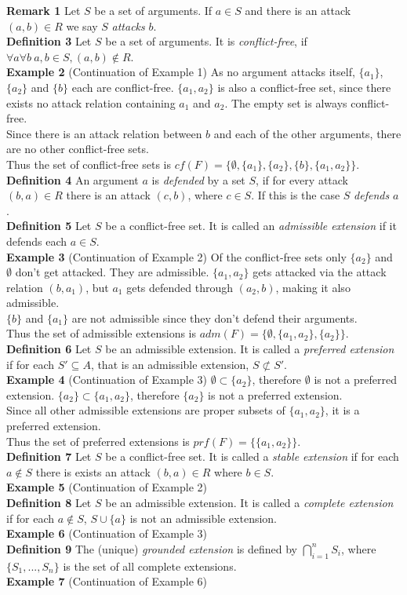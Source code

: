 \documentclass{article}
\newcommand{\nl}{\\[6pt]}
\newcommand{\dl}{\\[12pt]}
\begin{document}
\textbf{Remark 1} Let $S$ be a set of arguments. If $a\in S$ and there is an attack $(a,b)\in R$ we say $S$ \emph{attacks} $b$.\dl
\textbf{Definition 3} Let $S$ be a set of arguments. It is \emph{conflict-free}, if $\forall a \forall b\ a,b\in S, (a,b)\notin R$.\dl
\textbf{Example 2} (Continuation of Example 1) As no argument attacks itself, $\{a_1\}$, $\{a_2\}$ and $\{b\}$ each are conflict-free. $\{a_1,a_2\}$ is also a conflict-free set, since there exists no attack relation containing $a_1$ and $a_2$. The empty set is always conflict-free.\\
Since there is an attack relation between $b$ and each of the other arguments, there are no other conflict-free sets.\nl
Thus the set of conflict-free sets is $cf(F)=\{\emptyset,\{a_1\},\{a_2\},\{b\},\{a_1,a_2\}\}$.\dl
\textbf{Definition 4} An argument $a$ is \emph{defended} by a set $S$, if for every attack $(b,a)\in R$ there is an attack $(c,b)$, where $c\in S$. If this is the case $S$ \emph{defends} $a$.\dl
\textbf{Definition 5} Let $S$ be a conflict-free set. It is called an \emph{admissible extension} if it defends each $a\in S$.\dl
\textbf{Example 3} (Continuation of Example 2) Of the conflict-free sets only $\{a_2\}$ and \(\emptyset\) don't get attacked. They are admissible. $\{a_1,a_2\}$ gets attacked via the attack relation $(b,a_1)$, but $a_1$ gets defended through $(a_2,b)$, making it also admissible.\\
$\{b\}$ and $\{a_1\}$ are not admissible since they don't defend their arguments.\nl
Thus the set of admissible extensions is $adm(F)=\{\emptyset,\{a_1,a_2\},\{a_2\}\}$.\dl
\textbf{Definition 6} Let $S$ be an admissible extension. It is called a \emph{preferred extension} if for each $S'\subseteq A$, that is an admissible extension, $S\not\subset S'$.\dl
\textbf{Example 4} (Continuation of Example 3) $\emptyset\subset\{a_2\}$, therefore \(\emptyset\) is not a preferred extension. $\{a_2\}\subset\{a_1,a_2\}$, therefore $\{a_2\}$ is not a preferred extension.\\
Since all other admissible extensions are proper subsets of $\{a_1,a_2\}$, it is a preferred extension.\nl
Thus the set of preferred extensions is $prf(F)=\{\{a_1,a_2\}\}$.\dl
\textbf{Definition 7} Let $S$ be a conflict-free set. It is called a \emph{stable extension} if for each $a\not\in S$ there is exists an attack $(b,a)\in R$ where $b\in S$.\dl
\textbf{Example 5} (Continuation of Example 2) \dl %
\textbf{Definition 8} Let $S$ be an admissible extension. It is called a \emph{complete extension} if for each $a\not\in S$, $S\cup \{a\}$ is not an admissible extension.\dl
\textbf{Example 6} (Continuation of Example 3) \dl %
\textbf{Definition 9} The (unique) \emph{grounded extension} is defined by $\bigcap\limits_{i=1}^n{S_i}$, where $\{S_1,...,S_n\}$ is the set of all complete extensions.\dl
\textbf{Example 7} (Continuation of Example 6) \dl %
\end{document}
